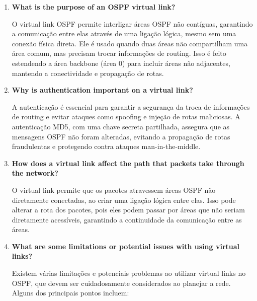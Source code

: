 \documentclass[11pt,english, openright, oneside]{book}
\begin{document}
\begin{enumerate}
  \item \textbf{What is the purpose of an OSPF virtual link?}
  \vspace{0.2cm}

  \par O virtual link OSPF permite interligar áreas OSPF não contíguas, garantindo a comunicação entre elas através de uma ligação lógica, mesmo sem uma conexão física direta. Ele é usado quando duas áreas não compartilham uma área comum, mas precisam trocar informações de routing. Isso é feito estendendo a área backbone (área 0) para incluir áreas não adjacentes, mantendo a conectividade e propagação de rotas.
  \vspace{0.2cm}

  \item \textbf{Why is authentication important on a virtual link?}
  \vspace{0.2cm}

  \par A autenticação é essencial para garantir a segurança da troca de informações de routing e evitar ataques como spoofing e injeção de rotas maliciosas. A autenticação MD5, com uma chave secreta partilhada, assegura que as mensagens OSPF não foram alteradas, evitando a propagação de rotas fraudulentas e protegendo contra ataques man-in-the-middle.
  \vspace{0.2cm}

  \item \textbf{How does a virtual link affect the path that packets take through the network?}
  \vspace{0.2cm}

  \par O virtual link permite que os pacotes atravessem áreas OSPF não diretamente conectadas, ao criar uma ligação lógica entre elas. Isso pode alterar a rota dos pacotes, pois eles podem passar por áreas que não seriam diretamente acessíveis, garantindo a continuidade da comunicação entre as áreas.
  \vspace{0.2cm}

  \item \textbf{What are some limitations or potential issues with using virtual links?}
  \vspace{0.2cm}

  \par Existem várias limitações e potenciais problemas ao utilizar virtual links no OSPF, que devem ser cuidadosamente considerados ao planejar a rede. Alguns dos principais pontos incluem:


\end{enumerate}
\end{document}
